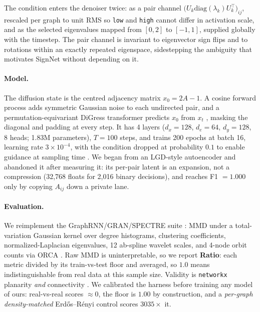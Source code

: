 \documentclass[11pt]{article}
\begin{document}
The condition enters the denoiser twice: as a pair channel $\big(U_k \mathrm{diag}(\lambda_k)
U_k^\top\big)_{ij}$, rescaled per graph to unit RMS so \texttt{low} and \texttt{high} cannot differ in activation
scale, and as the selected eigenvalues mapped from $[0,2]$ to $[-1,1]$, supplied globally with the
timestep. The pair channel is invariant to eigenvector sign flips
and to rotations within an exactly repeated eigenspace, sidestepping the ambiguity that motivates
SignNet \citep{lim2023signnet} without depending on it.

\paragraph{Model.}
\label{sec:model}
The diffusion state is the centred adjacency matrix $x_0 = 2A - 1$. A cosine forward process
\citep{nichol2021improved} adds symmetric Gaussian noise to each undirected pair, and a permutation-equivariant DiGress transformer predicts $x_0$ from $x_t$
\citep{ho2020ddpm,vignac2023digress}, masking the diagonal and padding at every step. It has
4 layers ($d_x{=}128$, $d_e{=}64$, $d_y{=}128$, 8 heads; 1.83M parameters), $T{=}100$ steps, and
trains 200 epochs at batch 16, learning rate $3\!\times\!10^{-4}$, with the condition dropped at
probability $0.1$ to enable guidance at sampling time \citep{ho2022cfg}. We began from an LGD-style autoencoder and abandoned it after measuring it: its per-pair latent is
an expansion, not a compression (32{,}768 floats for 2{,}016 binary decisions), and reaches F1
$=1.000$ only by copying $A_{ij}$ down a private lane.

\paragraph{Evaluation.} We reimplement the GraphRNN/GRAN/SPECTRE suite
\citep{you2018graphrnn,liao2019gran,martinkus2022spectre}: MMD \citep{gretton2012mmd} under a
total-variation Gaussian kernel over degree histograms, clustering coefficients,
normalized-Laplacian eigenvalues, 12 ab-spline wavelet scales, and 4-node orbit counts via ORCA
\citep{hocevar2014orca}. Raw MMD is uninterpretable, so we report \textbf{Ratio}: each metric
divided by its train-vs-test floor and averaged, so $1.0$ means indistinguishable from real data
at this sample size. Validity is \texttt{networkx} planarity \emph{and} connectivity \citep{hagberg2008networkx}. We calibrated the harness before
training any model of ours: real-vs-real scores ${\approx}0$, the floor is $1.00$ by construction,
and a \emph{per-graph density-matched} Erd\H{o}s--R\'enyi control \citep{erdos1959random} scores
$3035\times$ it.
\end{document}
